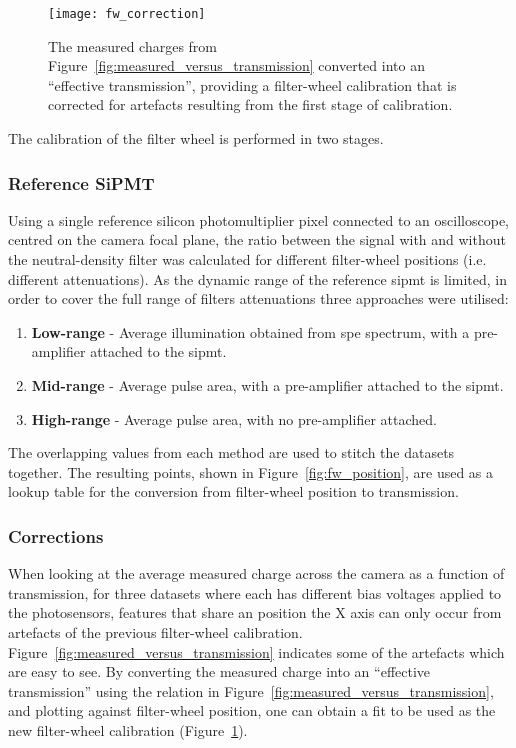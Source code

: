 \begin{figure}
	\centering
    \texttt{[image: fw\_correction]} 
	\caption[Secondary filter-wheel calibration]{The measured charges from Figure~\ref{fig:measured_versus_transmission} converted into an ``effective transmission'', providing a filter-wheel calibration that is corrected for artefacts resulting from the first stage of calibration.}
	\label{fig:fw_correction}
\end{figure}

The calibration of the filter wheel is performed in two stages.

\subsubsection{Reference SiPMT}
Using a single reference silicon photomultiplier pixel connected to an oscilloscope, centred on the camera focal plane, the ratio between the signal with and without the neutral-density filter was calculated for different filter-wheel positions (i.e. different attenuations). As the dynamic range of the reference \gls{sipmt} is limited, in order to cover the full range of filters attenuations three approaches were utilised:
\begin{enumerate}
\item \textbf{Low-range} - Average illumination obtained from \gls{spe} spectrum, with a pre-amplifier attached to the \gls{sipmt}.
\item \textbf{Mid-range} - Average pulse area, with a pre-amplifier attached to the \gls{sipmt}.
\item \textbf{High-range} - Average pulse area, with no pre-amplifier attached.
\end{enumerate}
The overlapping values from each method are used to stitch the datasets together. The resulting points, shown in Figure~\ref{fig:fw_position}, are used as a lookup table for the conversion from filter-wheel position to transmission.

\subsubsection{Corrections}

When looking at the average measured charge across the camera as a function of transmission, for three datasets where each has different bias voltages applied to the photosensors, features that share an position the X axis can only occur from artefacts of the previous filter-wheel calibration. Figure~\ref{fig:measured_versus_transmission} indicates some of the artefacts which are easy to see. By converting the measured charge into an ``effective transmission'' using the relation in Figure~\ref{fig:measured_versus_transmission}, and plotting against filter-wheel position, one can obtain a fit to be used as the new filter-wheel calibration (Figure~\ref{fig:fw_correction}).

